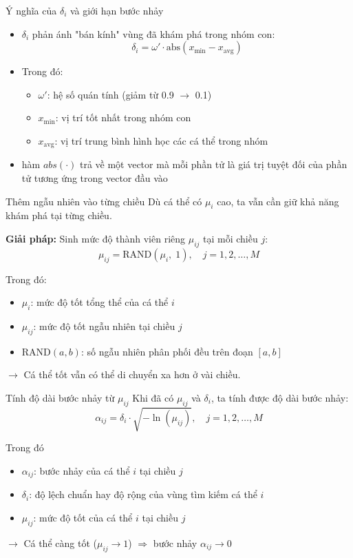 \documentclass[10pt]{beamer}
\begin{document}
\begin{frame}{Ý nghĩa của $\delta_i$ và giới hạn bước nhảy}
\begin{itemize}
    \item $\delta_i$ phản ánh "bán kính" vùng đã khám phá trong nhóm con:
    \[
    \delta_i = \omega' \cdot \text{abs}(x_{\min} - x_{\text{avg}})
    \]
    \item Trong đó:
    \begin{itemize}
        \item $\omega'$: hệ số quán tính (giảm từ 0.9 $\to$ 0.1)
        \item $x_{\min}$: vị trí tốt nhất trong nhóm con
        \item $x_{\text{avg}}$: vị trí trung bình hình học các cá thể trong nhóm
    \end{itemize}
    \item hàm $abs(\cdot)$ trả về một vector mà mỗi phần tử là giá trị tuyệt đối của phần tử tương ứng trong vector đầu vào
\end{itemize}
\end{frame}



\begin{frame}{Thêm ngẫu nhiên vào từng chiều}
Dù cá thể có $\mu_i$ cao, ta vẫn cần giữ khả năng khám phá tại từng chiều.

\textbf{Giải pháp:} Sinh mức độ thành viên riêng $\mu_{ij}$ tại mỗi chiều $j$:
\[
\mu_{ij} = \text{RAND}(\mu_i,\; 1), \quad j = 1, 2, \dots, M
\]

\vspace{0.5em}
Trong đó:
\begin{itemize}
    \item $\mu_i$: mức độ tốt tổng thể của cá thể $i$
    \item $\mu_{ij}$: mức độ tốt ngẫu nhiên tại chiều $j$
    \item $\text{RAND}(a,b)$: số ngẫu nhiên phân phối đều trên đoạn $[a, b]$
\end{itemize}

\vspace{0.5em}
\textbf{$\to$} Cá thể tốt vẫn có thể di chuyển xa hơn ở vài chiều.
\end{frame}


\begin{frame}{Tính độ dài bước nhảy từ $\mu_{ij}$}
Khi đã có $\mu_{ij}$ và $\delta_i$, ta tính được độ dài bước nhảy:
\[
\alpha_{ij} = \delta_i \cdot \sqrt{-\ln(\mu_{ij})}, \quad j = 1, 2, \dots, M
\]

Trong đó
\vspace{0.5em}
\begin{itemize}
    \item $\alpha_{ij}$: bước nhảy của cá thể $i$ tại chiều $j$
    \item $\delta_i$: độ lệch chuẩn hay độ rộng của vùng tìm kiếm cá thể $i$
    \item $\mu_{ij}$: mức độ tốt của cá thể $i$ tại chiều $j$
\end{itemize}

\vspace{0.5em}
\textbf{$\to$} Cá thể càng tốt ($\mu_{ij} \to 1$) $\Rightarrow$ bước nhảy $\alpha_{ij} \to 0$
\end{frame}
\end{document}
